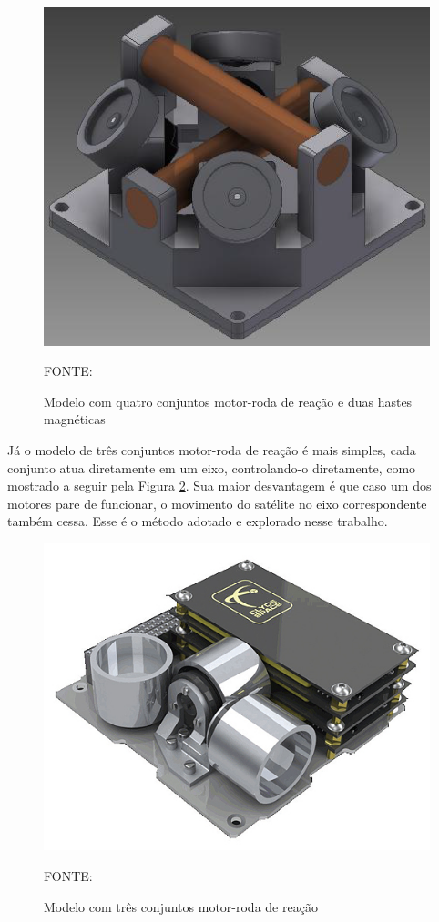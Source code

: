 \documentclass[
	12pt,				%
	openany,			%
	twoside,			%
	a4paper,			%
	english,			%
	french,				%
	spanish,			%
	brazil,				%
	oldfontcommands
	]{abntex2}
\begin{document}
\begin{figure}[th]
	\caption{Modelo com quatro conjuntos motor-roda de reação e duas hastes magnéticas}
	\centering
	\includegraphics[width=0.7\linewidth]{./figs/Ericksson_Reaction_Wheel}
	
	\begin{small}
		FONTE: \cite{Ericksson}
	\end{small}
	\label{fig:ERW}
\end{figure}

Já o modelo de três conjuntos motor-roda de reação é mais simples, cada conjunto atua diretamente em um eixo, controlando-o diretamente, como mostrado a seguir pela Figura \ref{fig:3RW}. Sua maior desvantagem é que caso um dos motores pare de funcionar, o movimento do satélite no eixo correspondente também cessa. Esse é o método adotado e explorado nesse trabalho.

\begin{figure}[th]
	\caption{Modelo com três conjuntos motor-roda de reação}
	\centering
	\includegraphics[width=0.7\linewidth]{./figs/3RW}
	
	\begin{small}
		FONTE: \cite{3RW}
	\end{small}
	\label{fig:3RW}
\end{figure}
\end{document}
